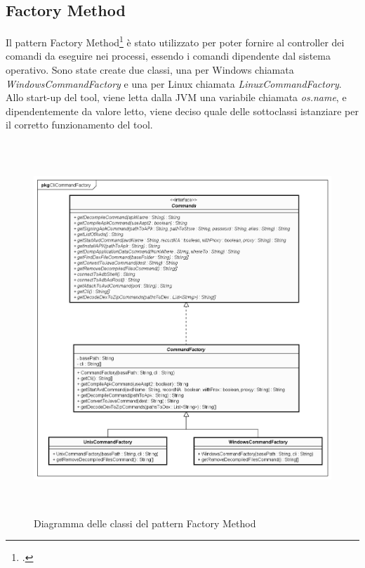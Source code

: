 \newpage
\subsection{Factory Method}\label{subsec:factory-method}
Il pattern Factory Method\footcite{womak:factory-method} è stato utilizzato per poter fornire al controller dei comandi da eseguire nei processi, essendo i comandi dipendente dal sistema operativo. Sono state create due classi, una per Windows chiamata \textit{WindowsCommandFactory} e una per Linux chiamata \textit{LinuxCommandFactory}.
Allo start-up del tool, viene letta dalla JVM una variabile chiamata \textit{os.name}, e dipendentemente da valore letto, viene deciso quale delle sottoclassi istanziare per il corretto funzionamento del tool.
\begin{figure}[H]
    \centering
    \includegraphics[width=14cm, height=14cm]{./immagini/diagrammi_uml/CommandFactory.png}
    \caption{Diagramma delle classi del pattern Factory Method}\label{fig:factory-method}
\end{figure}
